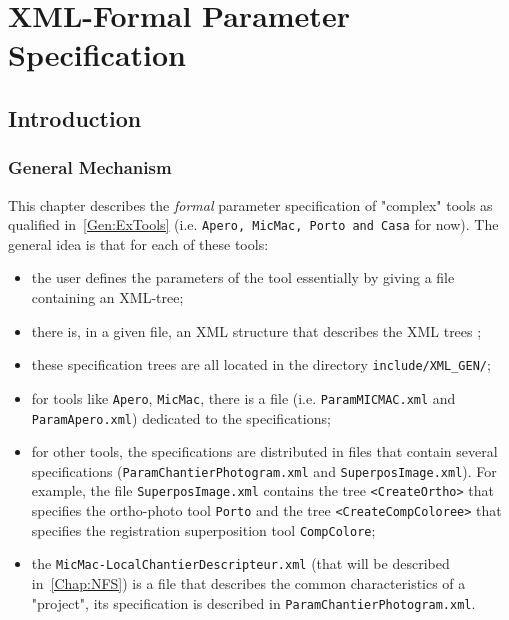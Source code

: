 \chapter{XML-Formal Parameter Specification}


\label{Mic:Tree:Match}


\section{Introduction}

\subsection{General Mechanism}

This chapter describes the \emph{formal} parameter specification of  "complex"
tools as qualified in~\ref{Gen:ExTools} (i.e. {\tt Apero,
MicMac, Porto and Casa} for now).  The general idea is that for each of these tools:

\begin{itemize}
   \item the user defines the parameters of the tool essentially by giving a file containing an XML-tree;

   \item there is, in a given file, an XML structure that describes the XML
         trees ;

   \item these specification trees are all located in the directory {\tt include/XML\_GEN/};
         
   \item for  tools like {\tt Apero}, {\tt MicMac}, there is a
         file  (i.e. {\tt ParamMICMAC.xml} and {\tt ParamApero.xml}) 
         dedicated  to the specifications; 

    \item for  other tools, the specifications  are  distributed in
          files that  contain several specifications 
          \newline ({\tt ParamChantierPhotogram.xml} and {\tt SuperposImage.xml}).
          For example, the file {\tt SuperposImage.xml} contains the tree 
          {\tt <CreateOrtho>} that specifies the ortho-photo  tool  {\tt Porto}
          and the tree {\tt <CreateCompColoree>} that specifies the registration 
          superposition tool {\tt CompColore};

   \item the {\tt MicMac-LocalChantierDescripteur.xml} (that will be described in~\ref{Chap:NFS})
         is a file  that describes the common characteristics of a "project", its specification
         is described in  {\tt ParamChantierPhotogram.xml}.
\end{itemize}


